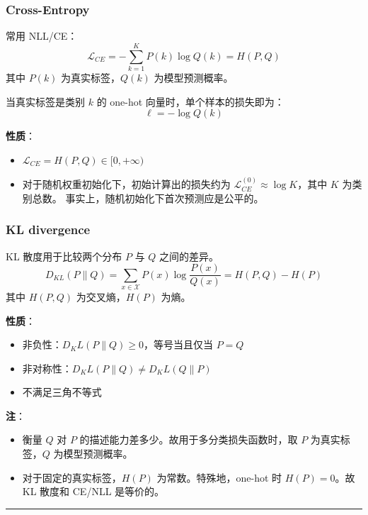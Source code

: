 \subsubsection{Cross-Entropy}\label{cross-entropy}

常用 NLL/CE： \[
\mathcal{L}_{CE} = -\sum_{k=1}^K P(k)\log Q(k) = H(P, Q)
\] 其中 \(P(k)\) 为真实标签，\(Q(k)\) 为模型预测概率。

当真实标签是类别 \(k\) 的 one-hot 向量时，单个样本的损失即为： \[
\ell = -\log Q(k)
\]

\textbf{性质}：

\begin{itemize}
\tightlist
\item
  \(\mathcal{L}_{CE} = H(P, Q) \in [0, +\infty)\)
\item
  对于随机权重初始化下，初始计算出的损失约为
  \(\mathcal{L}_{CE}^{(0)} \approx \log K\)，其中 \(K\) 为类别总数。
  事实上，随机初始化下首次预测应是公平的。
\end{itemize}

\subsubsection{KL divergence}\label{kl-divergence}

KL 散度用于比较两个分布 \(P\) 与 \(Q\) 之间的差异。 \[
D_{KL}(P\|Q)
= \sum_{x\in\mathcal{X}} P(x)\log\frac{P(x)}{Q(x)}
= H(P, Q) - H(P)
\] 其中 \(H(P, Q)\) 为交叉熵，\(H(P)\) 为熵。

\textbf{性质}：

\begin{itemize}
\tightlist
\item
  非负性：\(D_KL(P\|Q) \ge 0\)，等号当且仅当 \(P = Q\)
\item
  非对称性：\(D_KL(P\|Q) \ne D_KL(Q\|P)\)
\item
  不满足三角不等式
\end{itemize}

\textbf{注}：

\begin{itemize}
\tightlist
\item
  衡量 \(Q\) 对 \(P\) 的描述能力差多少。故用于多分类损失函数时，取 \(P\)
  为真实标签，\(Q\) 为模型预测概率。
\item
  对于固定的真实标签，\(H(P)\) 为常数。特殊地，one-hot 时
  \(H(P) = 0\)。故 KL 散度和 CE/NLL 是等价的。
\end{itemize}

\begin{center}\rule{0.5\linewidth}{0.5pt}\end{center}

